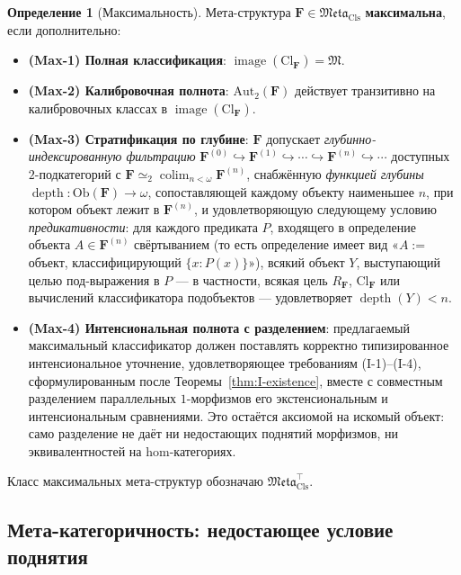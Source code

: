 \documentclass[11pt]{article}
\theoremstyle{plain}
\theoremstyle{definition}
\newtheorem{definition}[theorem]{Определение}
\newcommand{\fM}{\mathfrak{M}}
\newcommand{\Meta}{\mathfrak{Meta}}
\newcommand{\Ob}{\mathrm{Ob}}
\newcommand{\Cl}{\mathrm{Cl}}
\DeclareMathOperator{\colim}{colim}
\DeclareMathOperator{\image}{image}
\DeclareMathOperator{\dep}{depth}
\begin{document}
\begin{definition}[Максимальность]\label{def:maximality}
Мета-структура $\mathbf{F} \in \Meta_{\mathrm{Cls}}$ \textbf{максимальна}, если дополнительно:
\begin{itemize}
\item \textbf{(Max-1) Полная классификация}: $\image(\Cl_{\mathbf{F}}) = \fM$.
\item \textbf{(Max-2) Калибровочная полнота}: $\mathrm{Aut}_2(\mathbf{F})$ действует транзитивно на калибровочных классах в $\image(\Cl_{\mathbf{F}})$.
\item \textbf{(Max-3) Стратификация по глубине}: $\mathbf{F}$ допускает \emph{глубинно-индексированную фильтрацию} $\mathbf{F}^{(0)} \hookrightarrow \mathbf{F}^{(1)} \hookrightarrow \cdots \hookrightarrow \mathbf{F}^{(n)} \hookrightarrow \cdots$ доступных $2$-подкатегорий с $\mathbf{F} \simeq_2 \colim_{n < \omega} \mathbf{F}^{(n)}$, снабжённую \emph{функцией глубины} $\dep : \Ob(\mathbf{F}) \to \omega$, сопоставляющей каждому объекту наименьшее $n$, при котором объект лежит в $\mathbf{F}^{(n)}$, и удовлетворяющую следующему условию \emph{предикативности}: для каждого предиката $P$, входящего в определение объекта $A \in \mathbf{F}^{(n)}$ свёртыванием (то есть определение имеет вид «$A :=$ объект, классифицирующий $\{x : P(x)\}$»), всякий объект $Y$, выступающий целью под-выражения в $P$ --- в частности, всякая цель $R_\mathbf{F}$, $\Cl_\mathbf{F}$ или вычислений классификатора подобъектов --- удовлетворяет $\dep(Y) < n$.
\item \textbf{(Max-4) Интенсиональная полнота с разделением}: предлагаемый максимальный классификатор должен поставлять корректно типизированное интенсиональное уточнение, удовлетворяющее требованиям (I-1)--(I-4), сформулированным после Теоремы~\ref{thm:I-existence}, вместе с совместным разделением параллельных $1$-морфизмов его экстенсиональным и интенсиональным сравнениями. Это остаётся аксиомой на искомый объект: само разделение не даёт ни недостающих поднятий морфизмов, ни эквивалентностей на hom-категориях.
\end{itemize}
Класс максимальных мета-структур обозначаю $\Meta_{\mathrm{Cls}}^{\top}$.
\end{definition}

\subsection{Мета-категоричность: недостающее условие поднятия}
\end{document}
